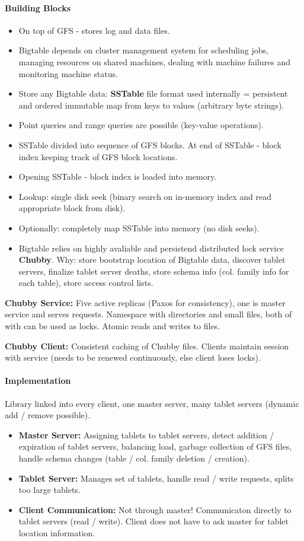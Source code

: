 \paragraph{Building Blocks}
\begin{itemize}
    \item On top of GFS - stores log and data files.
    \item Bigtable depends on cluster management system for scheduling jobs, managing resources on shared machines, dealing with machine failures and monitoring machine status.
    \item Store any Bigtable data: \textbf{SSTable} file format used internally = persistent and ordered immutable map from keys to values (arbitrary byte strings).
    \item Point queries and range queries are possible (key-value operations).
    \item SSTable divided into sequence of GFS blocks. At end of SSTable - block index keeping track of GFS block locations.
    \item Opening SSTable - block index is loaded into memory.
    \item Lookup: single disk seek (binary search on in-memory index and read appropriate block from disk).
    \item Optionally: completely map SSTable into memory (no disk seeks).
    \item Bigtable relies on highly avaliable and persistend distributed lock service \textbf{Chubby}. Why: store bootstrap location of Bigtable data, discover tablet servers, finalize tablet server deaths, store schema info (col. family info for each table), store access control lists.
\end{itemize}

\textbf{Chubby Service:} Five active replicas (Paxos for consistency), one is master service and serves requests. Namespace with directories and small files, both of with can be used as locks. Atomic reads and writes to files.

\textbf{Chubby Client:} Consistent caching of Chubby files. Clients maintain session with service (needs to be renewed continuously, else client loses locks).


\paragraph{Implementation}
Library linked into every client, one master server, many tablet servers (dynamic add / remove possible).
\begin{itemize}
    \item \textbf{Master Server:} Assigning tablets to tablet servers, detect addition / expiration of tablet servers, balancing load, garbage collection of GFS files, handle schema changes (table / col. family deletion / creation).
    \item \textbf{Tablet Server:} Manages set of tablets, handle read / write requests, splits too large tablets.
    \item \textbf{Client Communication:} Not through master! Communicaton directly to tablet servers (read / write). Client does not have to ask master for tablet location information.
\end{itemize}

